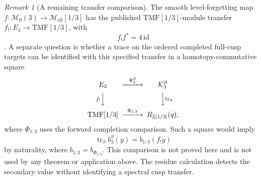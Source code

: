 \documentclass[11pt,a4paper]{amsart}
\newcommand{\Z}{\mathbb Z}
\newcommand{\TMF}{\mathrm{TMF}}
\newcommand{\tr}{\operatorname{tr}}
\newcommand{\cK}{\mathcal K}
\theoremstyle{plain}
\theoremstyle{definition}
\theoremstyle{remark}
\newtheorem{remark}[theorem]{Remark}
\begin{document}
\begin{remark}[A remaining transfer comparison]\label{prop:transfer-square}
The smooth level-forgetting map
$f:\mathcal M_0(3)\to\mathcal M_{\mathrm{ell}}[1/3]$
has the published $\TMF[1/3]$-module transfer
$f_!:E_3\to\TMF[1/3]$, with
\begin{equation}\label{eq:transfer-four}
 f_!f^*=4\,\mathrm{id}
\end{equation}
\cite[Proposition~3.5]{MR}. A separate question is whether a trace
on the ordered completed full-cusp targets can be identified with
this specified transfer in a homotopy-commutative square
\[
\begin{CD}
 E_3 @>{\Phi_3^\partial}>>\cK_3^\partial\\
 @V{f_!}VV @VV{\tr_\partial}V\\
 \TMF[1/3] @>{\Phi_{1;3}}>>R_{\Z[1/3]}(q),
\end{CD}
\]
where $\Phi_{1;3}$ uses the forward completion comparison.
Such a square would imply
\begin{equation}\label{eq:transfer-secondary}
 \tr_\partial b_3^\partial(y)=b_{1;3}(f_!y)
\end{equation}
by naturality, where $b_{1;3}=b_{\Phi_{1;3}}$.
This comparison is not proved here and is not used by any theorem
or application above. The residue calculation detects the
secondary value without identifying a spectral cusp transfer.
\end{remark}


\end{document}

